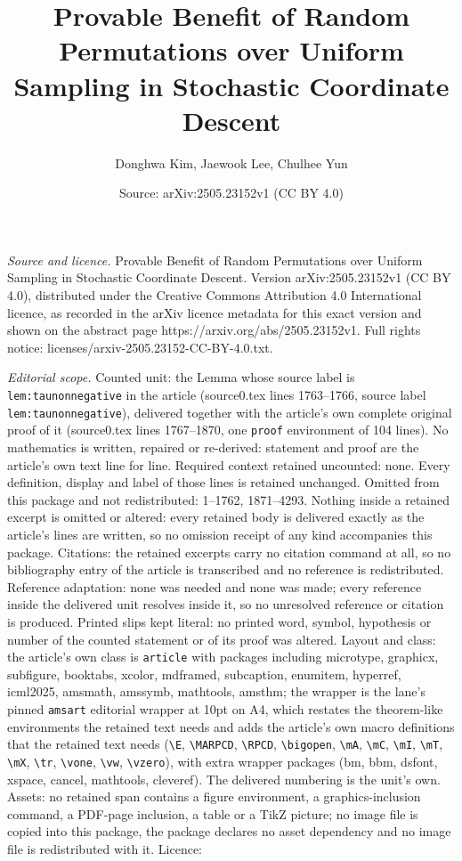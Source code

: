 \documentclass[10pt,a4paper]{amsart}
\title[Provable Benefit of Random Permutations over Uniform Samplin]{Provable Benefit of Random Permutations over Uniform Sampling in Stochastic Coordinate Descent}
\author{Donghwa Kim, Jaewook Lee, Chulhee Yun}
\date{Source: arXiv:2505.23152v1 (CC BY 4.0)}
\begin{document}
\maketitle

\noindent\emph{Source and licence.} Provable Benefit of Random Permutations over Uniform Sampling in Stochastic Coordinate Descent. Version arXiv:2505.23152v1 (CC BY 4.0), distributed under the Creative Commons Attribution 4.0 International licence, as recorded in the arXiv licence metadata for this exact version and shown on the abstract page https://arxiv.org/abs/2505.23152v1. Full rights notice: licenses/arxiv-2505.23152-CC-BY-4.0.txt.\par\smallskip

\noindent\textit{Editorial scope.} Counted unit: the Lemma whose source label is \texttt{lem:taunonnegative} in the article (source0.tex lines 1763--1766, source label \texttt{lem:taunonnegative}), delivered together with the article's own complete original proof of it (source0.tex lines 1767--1870, one \texttt{proof} environment of 104 lines). No mathematics is written, repaired or re-derived: statement and proof are the article's own text line for line. Required context retained uncounted: none. Every definition, display and label of those lines is retained unchanged. Omitted from this package and not redistributed: 1--1762, 1871--4293. Nothing inside a retained excerpt is omitted or altered: every retained body is delivered exactly as the article's lines are written, so no omission receipt of any kind accompanies this package. Citations: the retained excerpts carry no citation command at all, so no bibliography entry of the article is transcribed and no reference is redistributed. Reference adaptation: none was needed and none was made; every reference inside the delivered unit resolves inside it, so no unresolved reference or citation is produced. Printed slips kept literal: no printed word, symbol, hypothesis or number of the counted statement or of its proof was altered. Layout and class: the article's own class is \texttt{article} with packages including microtype, graphicx, subfigure, booktabs, xcolor, mdframed, subcaption, enumitem, hyperref, icml2025, amsmath, amssymb, mathtools, amsthm; the wrapper is the lane's pinned \texttt{amsart} editorial wrapper at 10pt on A4, which restates the theorem-like environments the retained text needs and adds the article's own macro definitions that the retained text needs (\texttt{\textbackslash E}, \texttt{\textbackslash MARPCD}, \texttt{\textbackslash RPCD}, \texttt{\textbackslash bigopen}, \texttt{\textbackslash mA}, \texttt{\textbackslash mC}, \texttt{\textbackslash mI}, \texttt{\textbackslash mT}, \texttt{\textbackslash mX}, \texttt{\textbackslash tr}, \texttt{\textbackslash vone}, \texttt{\textbackslash vw}, \texttt{\textbackslash vzero}), with extra wrapper packages (bm, bbm, dsfont, xspace, cancel, mathtools, cleveref). The delivered numbering is the unit's own. Assets: no retained span contains a figure environment, a graphics-inclusion command, a PDF-page inclusion, a table or a TikZ picture; no image file is copied into this package, the package declares no asset dependency and no image file is redistributed with it. Licence: 
\end{document}
